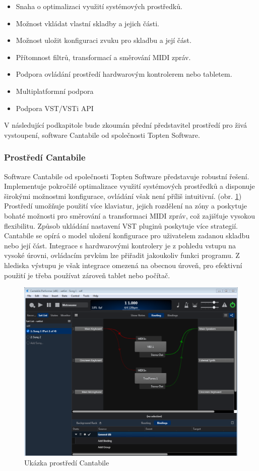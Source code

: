 \documentclass[thesis=M,czech]{FITthesis}[2019/03/06]
\begin{document}
			\begin{itemize}
				\item Snaha o optimalizaci využití systémových prostředků.
				\item Možnost vkládat vlastní skladby a jejich části.
				\item Možnost uložit konfiguraci zvuku pro skladbu a její část.
				\item Přítomnost filtrů, transformací a směrování MIDI zpráv.
				\item Podpora ovládání prostředí hardwarovým kontrolerem nebo tabletem.
				\item Multiplatformní podpora
				\item Podpora VST/VSTi API
			\end{itemize}
		
			V následující podkapitole bude zkoumán přední představitel prostředí pro živá vystoupení,
			software Cantabile od společnosti Topten Software.
			
			\subsubsection{Prostředí Cantabile}
				Software Cantabile od společnosti Topten Software představuje robustní řešení.
				Implementuje pokročilé optimalizace využití systémových prostředků a
				disponuje širokými možnostmi konfigurace, ovládání však není příliš intuitivní. (obr. \ref{fig:Cantabile})
				Prostředí umožňuje použití více klaviatur, jejich rozdělení na zóny a poskytuje bohaté možnosti
				pro směrování a transformaci MIDI zpráv, což zajišťuje vysokou flexibilitu.
				Způsob ukládání nastavení VST pluginů poskytuje více strategií.
				Cantabile se opírá o model uložení konfigurace pro uživatelem zadanou skladbu nebo její část.
				Integrace s hardwarovými kontrolery je z pohledu vstupu na vysoké úrovni, ovládacím prvkům lze přiřadit jakoukoliv 
				funkci programu. Z hlediska výstupu je však integrace omezená na obecnou úroveň, pro efektivní použití
				je třeba používat zároveň tablet nebo počítač.
				\begin{figure}[H]
					\centering
					\includegraphics[width=1\textwidth]{Cantabile}
					\caption[Bitwig Studio]{Ukázka prostředí Cantabile}\label{fig:Cantabile}
				\end{figure}
		
\end{document}
